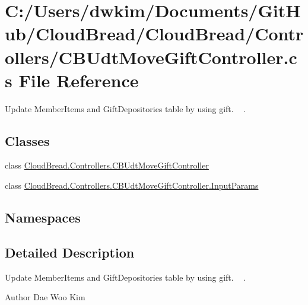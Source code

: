 \hypertarget{a00231}{}\section{C\+:/\+Users/dwkim/\+Documents/\+Git\+Hub/\+Cloud\+Bread/\+Cloud\+Bread/\+Controllers/\+C\+B\+Udt\+Move\+Gift\+Controller.cs File Reference}
\label{a00231}


Update Member\+Items and Gift\+Depositories table by using gift. ~\newline
.  


\subsection*{Classes}
\begin{DoxyCompactItemize}
\item 
class \hyperlink{a00060}{Cloud\+Bread.\+Controllers.\+C\+B\+Udt\+Move\+Gift\+Controller}
\item 
class \hyperlink{a00113}{Cloud\+Bread.\+Controllers.\+C\+B\+Udt\+Move\+Gift\+Controller.\+Input\+Params}
\end{DoxyCompactItemize}
\subsection*{Namespaces}
\begin{DoxyCompactItemize}
\end{DoxyCompactItemize}


\subsection{Detailed Description}
Update Member\+Items and Gift\+Depositories table by using gift. ~\newline
. 

\begin{DoxyAuthor}{Author}
Dae Woo Kim 
\end{DoxyAuthor}

